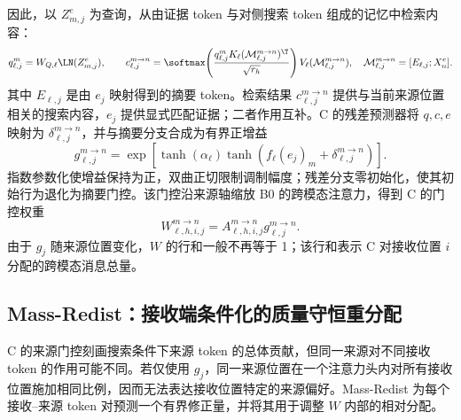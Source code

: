 因此，以 $Z_{m,j}^e$ 为查询，从由证据 token 与对侧搜索 token 组成的记忆中检索内容：
\begin{equation}
 q_{\ell,j}^{m}=W_{Q,\ell}\LN(Z_{m,j}^e),\qquad
 c_{\ell,j}^{m\to n}=\softmax\!\left(
 \frac{q_{\ell,j}^{m}K_\ell(\mathcal M_{\ell,j}^{m\to n})^{\T}}
 {\sqrt{r_h}}\right)V_\ell(\mathcal M_{\ell,j}^{m\to n}),
 \quad \mathcal M_{\ell,j}^{m\to n}=[E_{\ell,j};X_n^e].
 \label{eq:mr-retrieval}
\end{equation}
其中 $E_{\ell,j}$ 是由 $e_j$ 映射得到的摘要 token。检索结果 $c_{\ell,j}^{m\to n}$ 提供与当前来源位置相关的搜索内容，$e_j$ 提供显式匹配证据；二者作用互补。C 的残差预测器将 $q,c,e$ 映射为 $\delta_{\ell,j}^{m\to n}$，并与摘要分支合成为有界正增益
\begin{equation}
 g_{\ell,j}^{m\to n}=\exp\!\left[
 \tanh(\alpha_\ell)\tanh\!\left(f_\ell(e_j)_m+
 \delta_{\ell,j}^{m\to n}\right)\right].
 \label{eq:mr-c-gate}
\end{equation}
指数参数化使增益保持为正，双曲正切限制调制幅度；残差分支零初始化，使其初始行为退化为摘要门控。该门控沿来源轴缩放 B0 的跨模态注意力，得到 C 的门控权重
\begin{equation}
 W_{\ell,h,i,j}^{m\to n}
 =A_{\ell,h,i,j}^{m\to n}g_{\ell,j}^{m\to n}.
 \label{eq:mr-gated}
\end{equation}
由于 $g_j$ 随来源位置变化，$W$ 的行和一般不再等于 1；该行和表示 C 对接收位置 $i$ 分配的跨模态消息总量。

\subsection{Mass-Redist：接收端条件化的质量守恒重分配}
C 的来源门控刻画搜索条件下来源 token 的总体贡献，但同一来源对不同接收 token 的作用可能不同。若仅使用 $g_j$，同一来源位置在一个注意力头内对所有接收位置施加相同比例，因而无法表达接收位置特定的来源偏好。Mass-Redist 为每个接收--来源 token 对预测一个有界修正量，并将其用于调整 $W$ 内部的相对分配。

